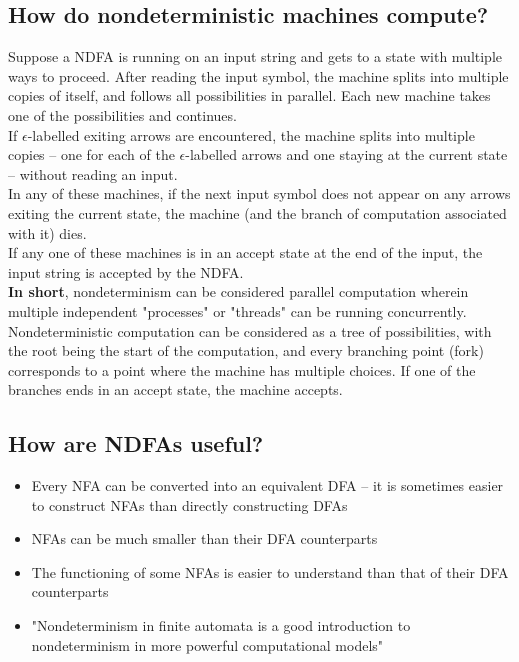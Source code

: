 \documentclass{article}
\begin{document}
\subsection{How do nondeterministic machines compute?}
Suppose a NDFA is running on an input string and gets to a state with multiple ways to proceed. After reading the input symbol, the machine splits into multiple copies of itself, and follows all possibilities in parallel. Each new machine takes one of the possibilities and continues.\medskip
\\ If $\epsilon$-labelled exiting arrows are encountered, the machine splits into multiple copies -- one for each of the $\epsilon$-labelled arrows and one staying at the current state -- without reading an input.\medskip
\\ In any of these machines, if the next input symbol does not appear on any arrows exiting the current state, the machine (and the branch of computation associated with it) dies.\medskip
\\ If any one of these machines is in an accept state at the end of the input, the input string is accepted by the NDFA.\medskip
\\\textbf{In short}, nondeterminism can be considered parallel computation wherein multiple independent "processes" or "threads" can be running concurrently.\medskip
\\ Nondeterministic computation can be considered as a tree of possibilities, with the root being the start of the computation, and every branching point (fork) corresponds to a point where the machine has multiple choices. If one of the branches ends in an accept state, the machine accepts.

\subsection{How are NDFAs useful?}
\begin{itemize}
	\item Every NFA can be converted into an equivalent DFA -- it is sometimes easier to construct NFAs than directly constructing DFAs
	\item NFAs can be much smaller than their DFA counterparts
	\item The functioning of some NFAs is easier to understand than that of their DFA counterparts
	\item "Nondeterminism in finite automata is a good introduction to nondeterminism in more powerful computational models"
\end{itemize}
\end{document}
